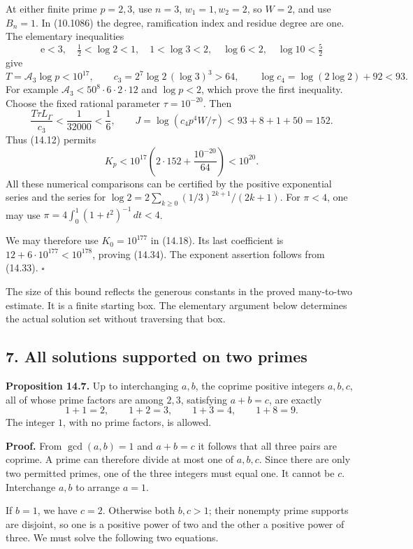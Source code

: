 \documentclass[
  11pt,
  a4paper,
]{article}
\newcounter{none} %
\begin{document}
At either finite prime \(p=2,3\), use \(n=3\), \(w_1=1,w_2=2\), so
\(W=2\), and use \(B_n=1\). In (10.1086) the degree, ramification index
and residue degree are one. The elementary inequalities \[
\mathrm e<3,\quad
\tfrac12<\log2<1,\quad 1<\log3<2,\quad
\log6<2,\quad\log10<\tfrac52
\] give \[
T=\mathcal A_3\log p<10^{17},\qquad
c_3=2^7\log2\,(\log3)^3>64,\qquad
\log c_4=\log(2\log2)+92<93.
\tag{14.38}
\] For example \(\mathcal A_3<50^8\cdot6\cdot2\cdot12\) and
\(\log p<2\), which prove the first inequality. Choose the fixed
rational parameter \(\tau=10^{-20}\). Then \[
\frac{T\tau L_\Gamma}{c_3}
 <\frac1{32000}<\frac16,\qquad
J=\log(c_4p^4W/\tau)<93+8+1+50=152.
\tag{14.39}
\] Thus (14.12) permits \[
K_p<10^{17}\left(2\cdot152+\frac{10^{-20}}{64}\right)
 <10^{20}.
\tag{14.40}
\] All these numerical comparisons can be certified by the positive
exponential series and the series for
\(\log2=2\sum_{k\ge0}(1/3)^{2k+1}/(2k+1)\). For \(\pi<4\), one may use
\(\pi=4\int_0^1(1+t^2)^{-1}\,dt<4\).

We may therefore use \(K_0=10^{177}\) in (14.18). Its last coefficient
is \(12+6\cdot10^{177}<10^{178}\), proving (14.34). The exponent
assertion follows from (14.33). \(\square\)

The size of this bound reflects the generous constants in the proved
many-to-two estimate. It is a finite starting box. The elementary
argument below determines the actual solution set without traversing
that box.

\subsection{7. All solutions supported on two
primes}\label{all-solutions-supported-on-two-primes}

\textbf{Proposition 14.7.} Up to interchanging \(a,b\), the coprime
positive integers \(a,b,c\), all of whose prime factors are among
\(2,3\), satisfying \(a+b=c\), are exactly \[
1+1=2,\qquad 1+2=3,\qquad 1+3=4,\qquad 1+8=9.
\tag{14.41}
\] The integer \(1\), with no prime factors, is allowed.

\textbf{Proof.} From \(\gcd(a,b)=1\) and \(a+b=c\) it follows that all
three pairs are coprime. A prime can therefore divide at most one of
\(a,b,c\). Since there are only two permitted primes, one of the three
integers must equal one. It cannot be \(c\). Interchange \(a,b\) to
arrange \(a=1\).

If \(b=1\), we have \(c=2\). Otherwise both \(b,c>1\); their nonempty
prime supports are disjoint, so one is a positive power of two and the
other a positive power of three. We must solve the following two
equations.
\end{document}
